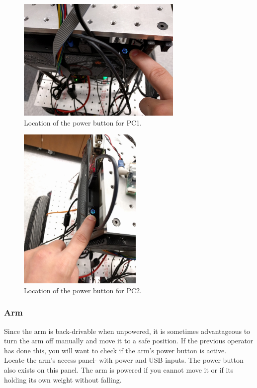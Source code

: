 \begin{figure}[h] 
  \centering
  \includegraphics[width=300px]{figures/computer_1_power.jpg}
  \caption{Location of the power button for PC1.}
  \label{fig:computer_1_power}
\end{figure}

\begin{figure}[h] 
  \centering
  \includegraphics[height=300px]{figures/computer_2_power.jpg}
  \caption{Location of the power button for PC2.}
  \label{fig:computer_2_power}
\end{figure}

\clearpage

\subsubsection{Arm}
Since the arm is back-drivable when unpowered, it is sometimes advantageous to turn the arm off manually and move it to a safe position. If the previous operator has done this, you will want to check if the arm's power button is active. \\

Locate the arm's access panel- with power and USB inputs. The power button also exists on this panel. The arm is powered if you cannot move it or if its holding its own weight without falling.

